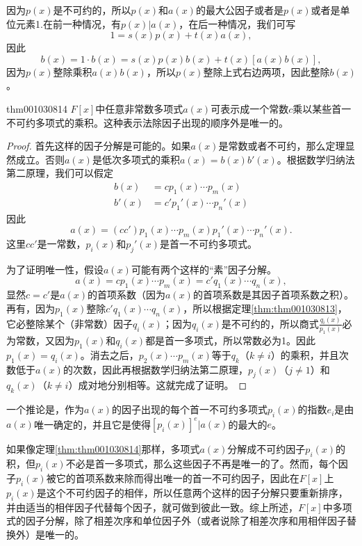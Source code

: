 因为$p(x)$是不可约的，所以$p(x)$和$a(x)$的最大公因子或者是$p(x)$或者是单位元素1.在前一种情况，有$p(x)|a(x)$，在后一种情况，我们可写
\[
1 = s(x)p(x)+t(x)a(x),
\]
因此
\[
b(x)=1\cdot b(x) = s(x)p(x)b(x)+t(x)[a(x)b(x)],
\]
因为$p(x)$整除乘积$a(x)b(x)$，所以$p(x)$整除上式右边两项，因此整除$b(x)$。

\begin{theorem}{}{thm001030814}
$F[x]$中任意非常数多项式$a(x)$可表示成一个常数$c$乘以某些首一不可约多项式的乘积。这种表示法除因子出现的顺序外是唯一的。
\end{theorem}

\begin{proof}
首先这样的因子分解是可能的。如果$a(x)$是常数或者不可约，那么定理显然成立。否则$a(x)$是低次多项式的乘积$a(x)=b(x)b'(x)$。根据数学归纳法第二原理，我们可以假定
\[
\begin{aligned}
b(x)&=cp_1(x)\cdots p_m(x)\\
b'(x)&=c'p_1'(x)\cdots p_n'(x)
\end{aligned}
\]
因此
\[
a(x)=(cc')p_1(x)\cdots p_m(x)p_1'(x)\cdots p_n'(x).
\]
这里$cc'$是一常数，$p_i(x)$和$p_j'(x)$是首一不可约多项式。


为了证明唯一性，假设$a(x)$可能有两个这样的“素”因子分解。
\[
a(x)=cp_1(x)\cdots p_m(x)=c'q_1(x) \cdots q_n(x),
\]
显然$c=c'$是$a(x)$的首项系数（因为$a(x)$的首项系数是其因子首项系数之积）。再有，因为$p_1(x)$整除$c'q_1(x)\cdots{}q_n(x)$，所以根据定理\ref{thm:thm001030813}，它必整除某个（非常数）因子$q_i(x)$；因为$q_i(x)$是不可约的，所以商式$\frac{q_i(x)}{p_1(x)}$必为常数，又因为$p_1(x)$和$q_i(x)$都是首一多项式，所以常数必为1。因此$p_1(x)=q_i(x)$。消去之后，$p_2(x)\cdots p_m(x)$等于$q_k$（$k \neq i$）的乘积，并且次数低于$a(x)$的次数，因此再根据数学归纳法第二原理，$p_j(x)$（$j \neq 1$）和$q_k(x)$（$k \neq i$）成对地分别相等。这就完成了证明。
\end{proof}

一个推论是，作为$a(x)$的因子出现的每个首一不可约多项式$p_i(x)$的指数$e_i$是由$a(x)$唯一确定的，并且它是使得$[p_i(x)]^e|a(x)$的最大的$e$。

如果像定理\ref{thm:thm001030814}那样，多项式$a(x)$分解成不可约因子$p_i(x)$的积，但$p_i(x)$不必是首一多项式，那么这些因子不再是唯一的了。然而，每个因子$p_i(x)$被它的首项系数来除而得出唯一的首一不可约因子，因此在$F[x]$上$p_i(x)$是这个不可约因子的相伴，所以任意两个这样的因子分解只要重新排序，并由适当的相伴因子代替每个因子，就可做到彼此一致。综上所述，$F[x]$中多项式的因子分解，除了相差次序和单位因子外（或者说除了相差次序和用相伴因子替换外）是唯一的。



